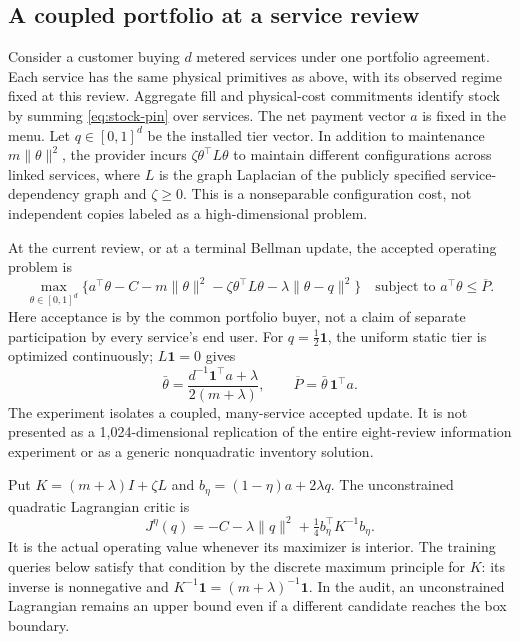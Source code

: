 \subsection{A coupled portfolio at a service review}\label{sec:portfolio}
Consider a customer buying $d$ metered services under one portfolio agreement. Each service has the same physical primitives as above, with its observed regime fixed at this review. Aggregate fill and physical-cost commitments identify stock by summing \eqref{eq:stock-pin} over services. The net payment vector $a$ is fixed in the menu. Let $q\in[0,1]^d$ be the installed tier vector. In addition to maintenance $m\|\theta\|^2$, the provider incurs $\zeta\theta^\top L\theta$ to maintain different configurations across linked services, where $L$ is the graph Laplacian of the publicly specified service-dependency graph and $\zeta\geq0$. This is a nonseparable configuration cost, not independent copies labeled as a high-dimensional problem.

At the current review, or at a terminal Bellman update, the accepted operating problem is
\begin{equation}\label{eq:portfolio}
 \max_{\theta\in[0,1]^d}
  \{a^\top\theta-C-m\|\theta\|^2-\zeta\theta^\top L\theta
                    -\lambda\|\theta-q\|^2\}
 \quad\text{subject to }a^\top\theta\leq\overline P.
\end{equation}
Here acceptance is by the common portfolio buyer, not a claim of separate participation by every service's end user. For $q=\tfrac12\mathbf1$, the uniform static tier is optimized continuously; $L\mathbf1=0$ gives
\[
 \bar\theta=\frac{d^{-1}\mathbf1^\top a+\lambda}{2(m+\lambda)},\qquad
 \overline P=\bar\theta\,\mathbf1^\top a.
\]
The experiment isolates a coupled, many-service accepted update. It is not presented as a 1,024-dimensional replication of the entire eight-review information experiment or as a generic nonquadratic inventory solution.

Put $K=(m+\lambda)I+\zeta L$ and $b_\eta=(1-\eta)a+2\lambda q$. The unconstrained quadratic Lagrangian critic is
\begin{equation}\label{eq:quadratic-critic}
 J^\eta(q)=-C-\lambda\|q\|^2+\tfrac14b_\eta^\top K^{-1}b_\eta.
\end{equation}
It is the actual operating value whenever its maximizer is interior. The training queries below satisfy that condition by the discrete maximum principle for $K$: its inverse is nonnegative and $K^{-1}\mathbf1=(m+\lambda)^{-1}\mathbf1$. In the audit, an unconstrained Lagrangian remains an upper bound even if a different candidate reaches the box boundary.

